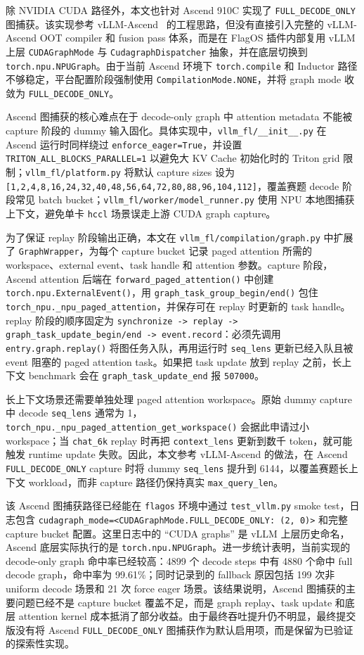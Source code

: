 \documentclass[UTF8,10.5pt]{ctexart}
\newcommand{\code}[1]{\texttt{#1}}
\begin{document}
除 NVIDIA CUDA 路径外，本文也针对 Ascend 910C 实现了 \code{FULL\_DECODE\_ONLY} 图捕获。该实现参考 vLLM-Ascend~\cite{vllm-ascend} 的工程思路，但没有直接引入完整的 vLLM-Ascend OOT compiler 和 fusion pass 体系，而是在 FlagOS 插件内部复用 vLLM 上层 \code{CUDAGraphMode} 与 \code{CudagraphDispatcher} 抽象，并在底层切换到 \code{torch.npu.NPUGraph}。由于当前 Ascend 环境下 \code{torch.compile} 和 Inductor 路径不够稳定，平台配置阶段强制使用 \code{CompilationMode.NONE}，并将 graph mode 收敛为 \code{FULL\_DECODE\_ONLY}。

Ascend 图捕获的核心难点在于 decode-only graph 中 attention metadata 不能被 capture 阶段的 dummy 输入固化。具体实现中，\code{vllm\_fl/\_\_init\_\_.py} 在 Ascend 运行时同样绕过 \code{enforce\_eager=True}，并设置 \code{TRITON\_ALL\_BLOCKS\_PARALLEL=1} 以避免大 KV Cache 初始化时的 Triton grid 限制；\code{vllm\_fl/platform.py} 将默认 capture sizes 设为 \code{[1,2,4,8,16,24,32,40,48,56,64,72,80,88,96,104,112]}，覆盖赛题 decode 阶段常见 batch bucket；\code{vllm\_fl/worker/model\_runner.py} 使用 NPU 本地图捕获上下文，避免单卡 \code{hccl} 场景误走上游 CUDA graph capture。

为了保证 replay 阶段输出正确，本文在 \code{vllm\_fl/compilation/graph.py} 中扩展了 \code{GraphWrapper}，为每个 capture bucket 记录 paged attention 所需的 workspace、external event、task handle 和 attention 参数。capture 阶段，Ascend attention 后端在 \code{forward\_paged\_attention()} 中创建 \code{torch.npu.ExternalEvent()}，用 \code{graph\_task\_group\_begin/end()} 包住 \code{torch\_npu.\_npu\_paged\_attention}，并保存可在 replay 时更新的 task handle。replay 阶段的顺序固定为 \code{synchronize -> replay -> graph\_task\_update\_begin/end -> event.record}：必须先调用 \code{entry.graph.replay()} 将图任务入队，再用运行时 \code{seq\_lens} 更新已经入队且被 event 阻塞的 paged attention task。如果把 task update 放到 replay 之前，长上下文 benchmark 会在 \code{graph\_task\_update\_end} 报 \code{507000}。

长上下文场景还需要单独处理 paged attention workspace。原始 dummy capture 中 decode \code{seq\_lens} 通常为 1，\code{torch\_npu.\_npu\_paged\_attention\_get\_workspace()} 会据此申请过小 workspace；当 \code{chat\_6k} replay 时再把 \code{context\_lens} 更新到数千 token，就可能触发 runtime update 失败。因此，本文参考 vLLM-Ascend 的做法，在 Ascend \code{FULL\_DECODE\_ONLY} capture 时将 dummy \code{seq\_lens} 提升到 6144，以覆盖赛题长上下文 workload，而非 capture 路径仍保持真实 \code{max\_query\_len}。

该 Ascend 图捕获路径已经能在 \code{flagos} 环境中通过 \code{test\_vllm.py} smoke test，日志包含 \code{cudagraph\_mode=<CUDAGraphMode.FULL\_DECODE\_ONLY: (2, 0)>} 和完整 capture bucket 配置。这里日志中的 ``CUDA graphs'' 是 vLLM 上层历史命名，Ascend 底层实际执行的是 \code{torch.npu.NPUGraph}。进一步统计表明，当前实现的 decode-only graph 命中率已经较高：4899 个 decode steps 中有 4880 个命中 full decode graph，命中率为 99.61\%；同时记录到的 fallback 原因包括 199 次非 uniform decode 场景和 21 次 force eager 场景。该结果说明，Ascend 图捕获的主要问题已经不是 capture bucket 覆盖不足，而是 graph replay、task update 和底层 attention kernel 成本抵消了部分收益。由于最终吞吐提升仍不明显，最终提交版没有将 Ascend \code{FULL\_DECODE\_ONLY} 图捕获作为默认启用项，而是保留为已验证的探索性实现。
\end{document}
